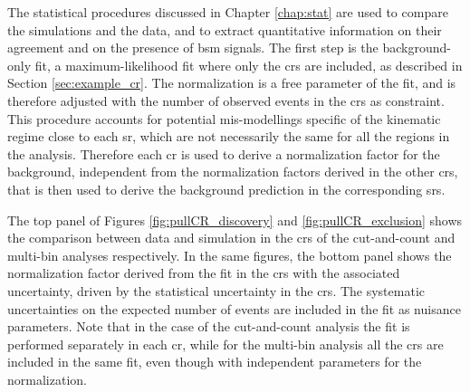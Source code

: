 The statistical procedures discussed in Chapter \ref{chap:stat} are used to compare the simulations and the data, and to extract 
quantitative information on their agreement and on the presence of \gls{bsm} signals. 
The first step is the background-only fit, a maximum-likelihood fit where only the \glspl{cr} are included, as described in Section 
\ref{sec:example_cr}. 
The \ttbar normalization is a free parameter of the fit, and is therefore adjusted with the number of observed events in the \glspl{cr} 
as constraint.
This procedure accounts for potential mis-modellings specific of the kinematic regime close to each \gls{sr}, which are not necessarily 
the same for all the regions in the analysis. Therefore each \gls{cr} is used to derive a normalization factor for the \ttbar background,
independent from the normalization factors derived in the other \glspl{cr}, that is then used to derive the background prediction in the 
corresponding \glspl{sr}. 

The top panel of Figures \ref{fig:pullCR_discovery} and \ref{fig:pullCR_exclusion} shows the 
comparison between data and simulation in the 
\glspl{cr} of the cut-and-count and multi-bin analyses respectively. In the same figures, the bottom panel 
shows the \ttbar normalization factor derived from the fit in the \glspl{cr} with the associated uncertainty, driven by the statistical uncertainty 
in the \glspl{cr}.  The systematic uncertainties on the expected number of events are included in the fit as nuisance parameters.
Note that in the case of the cut-and-count analysis the fit is performed separately in each \gls{cr}, 
while for the multi-bin analysis all the \glspl{cr} are included in the same fit, even though with independent parameters for the 
\ttbar normalization. 
 

